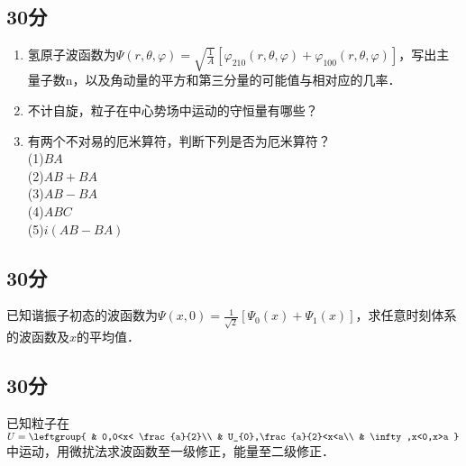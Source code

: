 
\subsection{30分}
\begin{enumerate}
\item 氢原子波函数为$\varPsi (r,\theta,\varphi)=\sqrt{\frac{1}{A}}[\varphi_{210}(r,\theta,\varphi)+\varphi_{100}(r,\theta,\varphi)]$，写出主量子数n，以及角动量的平方和第三分量的可能值与相对应的几率．
\item 不计自旋，粒子在中心势场中运动的守恒量有哪些？
\item 有两个不对易的厄米算符，判断下列是否为厄米算符？\\
(1)$BA$\\(2)$AB+BA$\\(3)$AB-BA$\\(4)$ABC$\\(5)$i(AB-BA)$
\end{enumerate}
\subsection{30分}
已知谐振子初态的波函数为$\varPsi(x,0)=\frac{1}{\sqrt{2}}[\varPsi_{0}(x)+\varPsi_{1}(x)]$，求任意时刻体系的波函数及$x$的平均值．
\subsection{30分}
已知粒子在$U=\leftgroup{
    & 0,0<x< \frac{a}{2}\\
    & U_{0},\frac{a}{2}<x<a\\
    & \infty,x<0,x>a
}$中运动，用微扰法求波函数至一级修正，能量至二级修正．